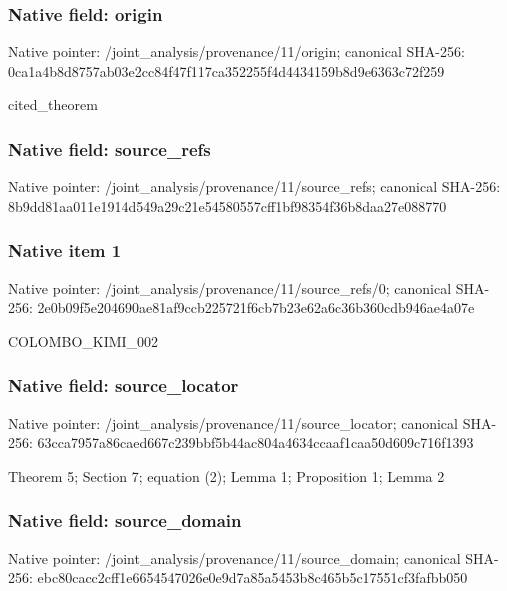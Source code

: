 \documentclass[10pt,a4paper]{article}
\begin{document}
\subsubsection{Native field: origin}


Native pointer: /joint\_analysis/provenance/11/origin; canonical SHA-256: 0ca1a4b8d8757ab03e2cc84f\allowbreak{}47f117ca352255f4d4434159\allowbreak{}b8d9e6363c72f259


cited\_theorem


\subsubsection{Native field: source\_refs}


Native pointer: /joint\_analysis/provenan\allowbreak{}ce/11/source\_refs; canonical SHA-256: 8b9dd81aa011e1914d549a29\allowbreak{}c21e54580557cff1bf98354f\allowbreak{}36b8daa27e088770



\subsubsection{Native item 1}


Native pointer: /joint\_analysis/provenan\allowbreak{}ce/11/source\_refs/0; canonical SHA-256: 2e0b09f5e204690ae81af9cc\allowbreak{}b225721f6cb7b23e62a6c36b\allowbreak{}360cdb946ae4a07e


COLOMBO\_KIMI\_002


\subsubsection{Native field: source\_locator}


Native pointer: /joint\_analysis/provenan\allowbreak{}ce/11/source\_locator; canonical SHA-256: 63cca7957a86caed667c239b\allowbreak{}bf5b44ac804a4634ccaaf1ca\allowbreak{}a50d609c716f1393


Theorem 5; Section 7; equation (2); Lemma 1; Proposition 1; Lemma 2


\subsubsection{Native field: source\_domain}


Native pointer: /joint\_analysis/provenan\allowbreak{}ce/11/source\_domain; canonical SHA-256: ebc80cacc2cff1e665454702\allowbreak{}6e0e9d7a85a5453b8c465b5c\allowbreak{}17551cf3fafbb050
\end{document}

